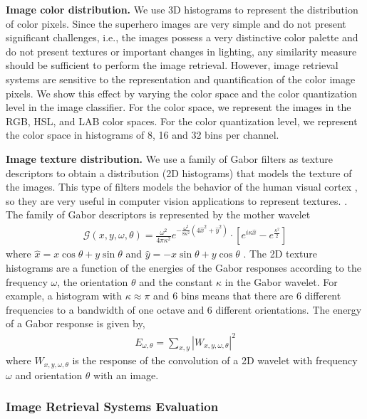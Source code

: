 \textbf{Image color distribution.
}We use 3D histograms to represent the distribution of color pixels. Since the superhero images are very simple and do not present significant challenges, i.e., the images possess a very distinctive color palette and do not present textures or important changes in lighting, any similarity measure should be sufficient to perform the image retrieval. However, image retrieval systems are sensitive to the representation and quantification of the color image pixels. We show this effect by varying the color space and the color quantization level in the image classifier. For the color space, we represent the images in the RGB, HSL, and LAB color spaces. For the color quantization level, we represent the color space in histograms of 8, 16 and 32 bins per channel.

\textbf{Image texture distribution.} We use a family of Gabor filters as texture descriptors to obtain a distribution (2D histograms) that models the texture of the images. This type of filters models the behavior of the human visual cortex \citep{Daugman:TASSP:1988}, so they are very useful in computer vision applications to represent textures. \citep{Lee:PAMI:1996}. The family of Gabor descriptors is represented by the mother wavelet
\begin{eqnarray}
 \mathcal{G}(x,y,\omega,\theta) = \frac{\omega^2}{4\pi\kappa^2} e^{-\frac{\omega^2}{8\kappa^2}\left(4\hat{x}^2 + \hat{y}^2\right)} \cdot [e ^{i \kappa \hat{x}} -e ^ {\frac{\kappa ^ 2}{2}} ]  \label{eq:gabor_filters}
\end{eqnarray}
where $\hat{x} = x \cos \theta +  y \sin \theta$ and $\hat{y} = -x\sin \theta + y \cos \theta$ . The 2D texture histograms are a function of the energies of the Gabor responses according to the frequency $\omega$, the orientation $\theta$ and the constant $\kappa$ in the Gabor wavelet. For example, a histogram with $\kappa \approx \pi$ and 6 bins means that there are 6 different frequencies to a bandwidth of one octave and 6 different orientations. The energy of a Gabor response is given by, 
\begin{eqnarray} 
 E_{\omega,\theta} = \sum\nolimits_{x, y}|W_{x,y,\omega,\theta}|^2 \label{eq:g_energy}
\end{eqnarray}
where $W_{x,y,\omega,\theta}$ is the response of the convolution of a 2D wavelet with frequency $\omega$ and orientation $\theta$ with an image. 

\subsubsection{Image Retrieval Systems Evaluation} \label{subsubsec:evaluation}

